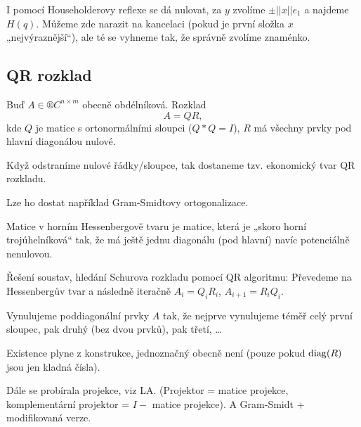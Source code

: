 \documentclass[12pt]{article}					%
\begin{document}
	\begin{poznamka}
		I pomocí Householderovy reflexe se dá nulovat, za $y$ zvolíme $±||x||e_1$ a najdeme $H(q)$. Můžeme zde narazit na kancelaci (pokud je první složka $x$ „nejvýraznější“), ale té se vyhneme tak, že správně zvolíme znaménko.
	\end{poznamka}

	\subsection{QR rozklad}
	\begin{definice}
		Buď $A \in ®C^{n \times m}$ obecně obdélníková. Rozklad
		$$ A = QR, $$
		kde $Q$ je matice s ortonormálními sloupci ($Q*Q = I$), $R$ má všechny prvky pod hlavní diagonálou nulové.

		Když odstraníme nulové řádky/sloupce, tak dostaneme tzv. ekonomický tvar QR rozkladu.

		\begin{poznamkain}
			Lze ho dostat například Gram-Smidtovy ortogonalizace.
		\end{poznamkain}
	\end{definice}

	\begin{definice}
		Matice v horním Hessenbergově tvaru je matice, která je „skoro horní trojúhelníková“ tak, že má ještě jednu diagonálu (pod hlavní) navíc potenciálně nenulovou.
	\end{definice}

	\begin{poznamka}
		Řešení soustav, hledání Schurova rozkladu pomocí QR algoritmu: Převedeme na Hessenbergův tvar a následně iteračně $A_i = Q_iR_i$, $A_{i+1} = R_iQ_i$.
	\end{poznamka}

	\begin{definice}
		Vynulujeme poddiagonální prvky $A$ tak, že nejprve vynulujeme téměř celý první sloupec, pak druhý (bez dvou prvků), pak třetí, …
	\end{definice}

	\begin{poznamka}
		Existence plyne z konstrukce, jednoznačný obecně není (pouze pokud $\operatorname{diag}(R)$ jsou jen kladná čísla).
	\end{poznamka}


	\begin{poznamka}
		Dále se probírala projekce, viz LA. (Projektor = matice projekce, komplementární projektor = $I - $ matice projekce). A Gram-Smidt + modifikovaná verze.
	\end{poznamka}
\end{document}
